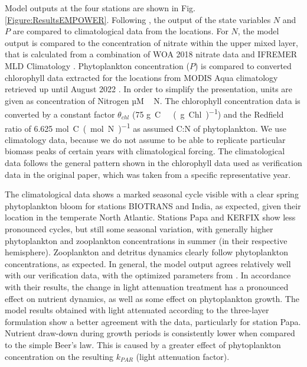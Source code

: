 \documentclass[journal abbreviation, manuscript]{copernicus}
\begin{document}
Model outputs at the four stations are shown in Fig. \ref{Figure:ResultsEMPOWER}. Following \citet{Anderson2015c}, the output of the state variables $N$ and $P$ are compared to climatological data from the locations. For $N$, the model output is compared to the concentration of nitrate within the upper mixed layer, that is calculated from a combination of WOA 2018 nitrate data \citep{Garcia2019WORLDSilicate} and IFREMER MLD Climatology \citep{DeBoyerMontegut2004}. Phytoplankton concentration ($P$) is compared to converted chlorophyll data extracted for the locations from MODIS Aqua climatology retrieved up until August 2022 \citep{NASAGoddardSpaceFlightCenterOceanEcologyLaboratoryOceanBiologyProcessingGroup}. In order to simplify the presentation, units are given as concentration of Nitrogen \unit{µM\,N}. The chlorophyll concentration data is converted by a constant factor $\theta_{chl}$ (75 \unit{g C \ (g Chl)^{−1}}) and the Redfield ratio of 6.625 \unit{mol C (mol N)^{-1}} as assumed C:N of phytoplankton. We use climatology data, because we do not assume to be able to replicate particular biomass peaks of certain years with climatological forcing. The climatological data follows the general pattern shown in the chlorophyll data used as verification data in the original paper, which was taken from a specific representative year.

The climatological data shows a marked seasonal cycle visible with a clear spring phytoplankton bloom for stations BIOTRANS and India, as expected, given their location in the temperate North Atlantic. Stations Papa and KERFIX show less pronounced cycles, but still some seasonal variation, with generally higher phytoplankton and zooplankton concentrations in summer (in their respective hemisphere). Zooplankton and detritus dynamics clearly follow phytoplankton concentrations, as expected.
In general, the model output agrees relatively well with our verification data, with the optimized parameters from \citet{Anderson2015c}. In accordance with their results, the change in light attenuation treatment has a pronounced effect on nutrient dynamics, as well as some effect on phytoplankton growth. The model results obtained with light attenuated according to the three-layer formulation show a better agreement with the data, particularly for station Papa. Nutrient draw-down during growth periods is consistently lower when compared to the simple Beer's law. This is caused by a greater effect of phytoplankton concentration on the resulting $k_{PAR}$ (light attenuation factor).
\end{document}
